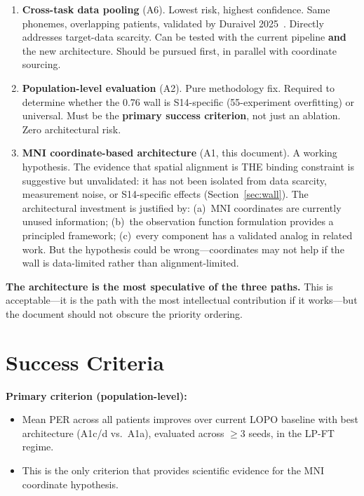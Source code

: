 \documentclass[11pt,letterpaper]{article}
\begin{document}
\begin{enumerate}[leftmargin=2em]
\item \textbf{Cross-task data pooling} (A6). Lowest risk, highest confidence. Same phonemes, overlapping patients, validated by Duraivel 2025~\cite{duraivel2025}. Directly addresses target-data scarcity. Can be tested with the current pipeline \textbf{and} the new architecture. Should be pursued first, in parallel with coordinate sourcing.

\item \textbf{Population-level evaluation} (A2). Pure methodology fix. Required to determine whether the 0.76 wall is S14-specific (55-experiment overfitting) or universal. Must be the \textbf{primary success criterion}, not just an ablation. Zero architectural risk.

\item \textbf{MNI coordinate-based architecture} (A1, this document). A working hypothesis. The evidence that spatial alignment is THE binding constraint is suggestive but unvalidated: it has not been isolated from data scarcity, measurement noise, or S14-specific effects (Section~\ref{sec:wall}). The architectural investment is justified by: (a)~MNI coordinates are currently unused information; (b)~the observation function formulation provides a principled framework; (c)~every component has a validated analog in related work. But the hypothesis could be wrong---coordinates may not help if the wall is data-limited rather than alignment-limited.
\end{enumerate}

\textbf{The architecture is the most speculative of the three paths.} This is acceptable---it is the path with the most intellectual contribution if it works---but the document should not obscure the priority ordering.


\section{Success Criteria}\label{sec:success}

\textbf{Primary criterion (population-level):}
\begin{itemize}[leftmargin=2em]
\item Mean PER across all patients improves over current LOPO baseline with best architecture (A1c/d vs.\ A1a), evaluated across ${\geq}3$ seeds, in the LP-FT regime.
\item This is the only criterion that provides scientific evidence for the MNI coordinate hypothesis.
\end{itemize}
\end{document}
